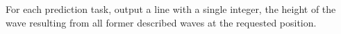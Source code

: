 
  For each prediction task, output a line with a single integer, the height of the wave resulting from all former described waves at the requested position.
